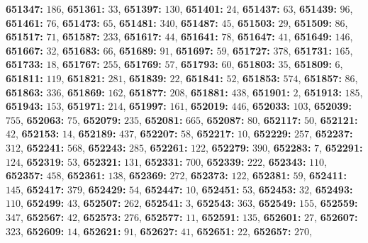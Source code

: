 \textsf{\bfseries 651347:} $186$, \textsf{\bfseries 651361:} $33$, \textsf{\bfseries 651397:} $130$, \textsf{\bfseries 651401:} $24$, \textsf{\bfseries 651437:} $63$, \textsf{\bfseries 651439:} $96$, \textsf{\bfseries 651461:} $76$, \textsf{\bfseries 651473:} $65$, \textsf{\bfseries 651481:} $340$, \textsf{\bfseries 651487:} $45$, \textsf{\bfseries 651503:} $29$, \textsf{\bfseries 651509:} $86$, \textsf{\bfseries 651517:} $71$, \textsf{\bfseries 651587:} $233$, \textsf{\bfseries 651617:} $44$, \textsf{\bfseries 651641:} $78$, \textsf{\bfseries 651647:} $41$, \textsf{\bfseries 651649:} $146$, \textsf{\bfseries 651667:} $32$, \textsf{\bfseries 651683:} $66$, \textsf{\bfseries 651689:} $91$, \textsf{\bfseries 651697:} $59$, \textsf{\bfseries 651727:} $378$, \textsf{\bfseries 651731:} $165$, \textsf{\bfseries 651733:} $18$, \textsf{\bfseries 651767:} $255$, \textsf{\bfseries 651769:} $57$, \textsf{\bfseries 651793:} $60$, \textsf{\bfseries 651803:} $35$, \textsf{\bfseries 651809:} $6$, \textsf{\bfseries 651811:} $119$, \textsf{\bfseries 651821:} $281$, \textsf{\bfseries 651839:} $22$, \textsf{\bfseries 651841:} $52$, \textsf{\bfseries 651853:} $574$, \textsf{\bfseries 651857:} $86$, \textsf{\bfseries 651863:} $336$, \textsf{\bfseries 651869:} $162$, \textsf{\bfseries 651877:} $208$, \textsf{\bfseries 651881:} $438$, \textsf{\bfseries 651901:} $2$, \textsf{\bfseries 651913:} $185$, \textsf{\bfseries 651943:} $153$, \textsf{\bfseries 651971:} $214$, \textsf{\bfseries 651997:} $161$, \textsf{\bfseries 652019:} $446$, \textsf{\bfseries 652033:} $103$, \textsf{\bfseries 652039:} $755$, \textsf{\bfseries 652063:} $75$, \textsf{\bfseries 652079:} $235$, \textsf{\bfseries 652081:} $665$, \textsf{\bfseries 652087:} $80$, \textsf{\bfseries 652117:} $50$, \textsf{\bfseries 652121:} $42$, \textsf{\bfseries 652153:} $14$, \textsf{\bfseries 652189:} $437$, \textsf{\bfseries 652207:} $58$, \textsf{\bfseries 652217:} $10$, \textsf{\bfseries 652229:} $257$, \textsf{\bfseries 652237:} $312$, \textsf{\bfseries 652241:} $568$, \textsf{\bfseries 652243:} $285$, \textsf{\bfseries 652261:} $122$, \textsf{\bfseries 652279:} $390$, \textsf{\bfseries 652283:} $7$, \textsf{\bfseries 652291:} $124$, \textsf{\bfseries 652319:} $53$, \textsf{\bfseries 652321:} $131$, \textsf{\bfseries 652331:} $700$, \textsf{\bfseries 652339:} $222$, \textsf{\bfseries 652343:} $110$, \textsf{\bfseries 652357:} $458$, \textsf{\bfseries 652361:} $138$, \textsf{\bfseries 652369:} $272$, \textsf{\bfseries 652373:} $122$, \textsf{\bfseries 652381:} $59$, \textsf{\bfseries 652411:} $145$, \textsf{\bfseries 652417:} $379$, \textsf{\bfseries 652429:} $54$, \textsf{\bfseries 652447:} $10$, \textsf{\bfseries 652451:} $53$, \textsf{\bfseries 652453:} $32$, \textsf{\bfseries 652493:} $110$, \textsf{\bfseries 652499:} $43$, \textsf{\bfseries 652507:} $262$, \textsf{\bfseries 652541:} $3$, \textsf{\bfseries 652543:} $363$, \textsf{\bfseries 652549:} $155$, \textsf{\bfseries 652559:} $347$, \textsf{\bfseries 652567:} $42$, \textsf{\bfseries 652573:} $276$, \textsf{\bfseries 652577:} $11$, \textsf{\bfseries 652591:} $135$, \textsf{\bfseries 652601:} $27$, \textsf{\bfseries 652607:} $323$, \textsf{\bfseries 652609:} $14$, \textsf{\bfseries 652621:} $91$, \textsf{\bfseries 652627:} $41$, \textsf{\bfseries 652651:} $22$, \textsf{\bfseries 652657:} $270$, 
